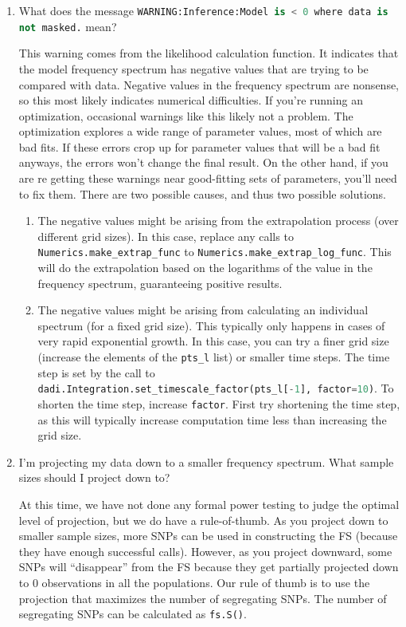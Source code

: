 \documentclass[12pt]{article}
\makeatletter
\newcommand{\py}[1]{\lstinline[language=Python, showstringspaces=False]@#1@}
\makeatother
\begin{document}
\begin{enumerate}
\item What does the message \py{WARNING:Inference:Model is < 0 where data is not masked.} mean?

This warning comes from the likelihood calculation function.
It indicates that the model frequency spectrum has negative values that are trying to be compared with data.
Negative values in the frequency spectrum are nonsense, so this most likely indicates numerical difficulties.
If you're running an optimization, occasional warnings like this likely not a problem.
The optimization explores a wide range of parameter values, most of which are bad fits.
If these errors crop up for parameter values that will be a bad fit anyways, the errors won't change the final result.
On the other hand, if you are re getting these warnings near good-fitting sets of parameters, you'll need to fix them.
There are two possible causes, and thus two possible solutions.

\begin{enumerate}
\item The negative values might be arising from the extrapolation process (over different grid sizes).
In this case, replace any calls to \py{Numerics.make_extrap_func} to \py{Numerics.make_extrap_log_func}.
This will do the extrapolation based on the logarithms of the value in the frequency spectrum, guaranteeing positive results.

\item The negative values might be arising from calculating an individual spectrum (for a fixed grid size).
This typically only happens in cases of very rapid exponential growth.
In this case, you can try a finer grid size (increase the elements of the \py{pts_l} list) or smaller time steps.
The time step is set by the call to \py{dadi.Integration.set_timescale_factor(pts_l[-1], factor=10)}.
To shorten the time step, increase \py{factor}.
First try shortening the time step, as this will typically increase computation time less than increasing the grid size.
\end{enumerate}

\item I'm projecting my data down to a smaller frequency spectrum. What sample sizes should I project down to?

At this time, we have not done any formal power testing to judge the optimal level of projection, but we do have a rule-of-thumb.
As you project down to smaller sample sizes, more SNPs can be used in constructing the FS (because they have
enough successful calls).
However, as you project downward, some SNPs will ``disappear'' from the FS because they get partially projected down
to 0 observations in all the populations.
Our rule of thumb is to use the projection that maximizes the number of segregating SNPs.
The number of segregating SNPs can be calculated as \py{fs.S()}.


\end{enumerate}
\end{document}
